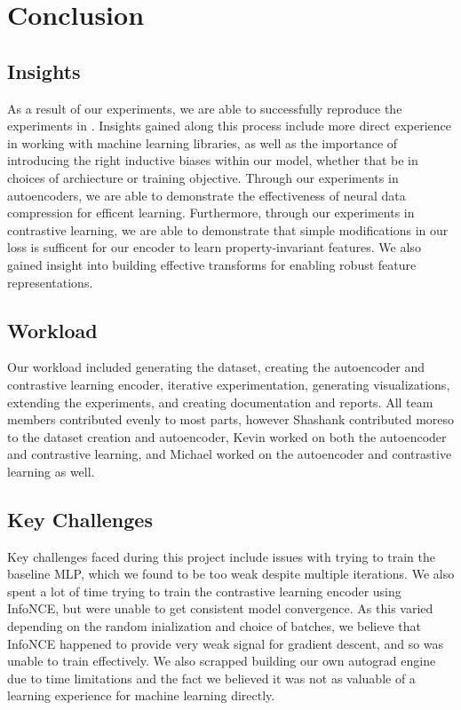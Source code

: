 \documentclass{article}
\begin{document}
\section{Conclusion}

\subsection{Insights}
As a result of our experiments, we are able to successfully reproduce the experiments in \cite{foundationsCVbook}. Insights gained along this process include more direct experience in working with machine learning libraries, as well as the importance of introducing the right inductive biases within our model, whether that be in choices of archiecture or training objective. Through our experiments in autoencoders, we are able to demonstrate the effectiveness of neural data compression for efficent learning. Furthermore, through our experiments in contrastive learning, we are able to demonstrate that simple modifications in our loss is sufficent for our encoder to learn property-invariant features. We also gained insight into building effective transforms for enabling robust feature representations.

\subsection{Workload}
Our workload included generating the dataset, creating the autoencoder and contrastive learning encoder, iterative experimentation, generating visualizations, extending the experiments, and creating documentation and reports. All team members contributed evenly to most parts, however Shashank contributed moreso to the dataset creation and autoencoder, Kevin worked on both the autoencoder and contrastive learning, and Michael worked on the autoencoder and contrastive learning as well.


\subsection{Key Challenges}
Key challenges faced during this project include issues with trying to train the baseline MLP, which we found to be too weak despite multiple iterations. We also spent a lot of time trying to train the contrastive learning encoder using InfoNCE, but were unable to get consistent model convergence. As this varied depending on the random inialization and choice of batches, we believe that InfoNCE happened to provide very weak signal for gradient descent, and so was unable to train effectively. We also scrapped building our own autograd engine due to time limitations and the fact we believed it was not as valuable of a learning experience for machine learning directly.
\end{document}
